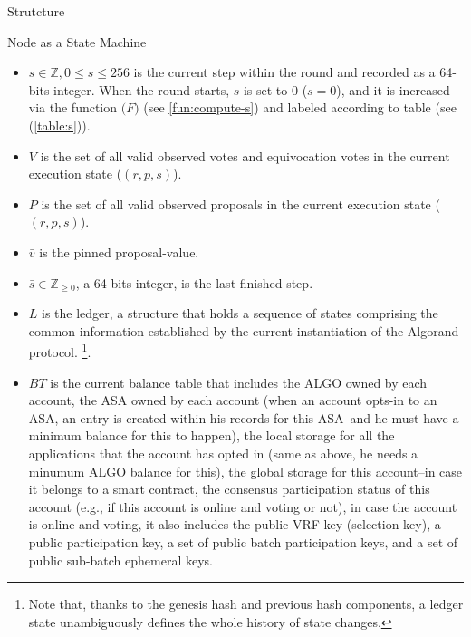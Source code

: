 \documentclass[10pt,a4paper]{article}
\begin{document}
\begin{section}{Strutcture}
\begin{subsection}{Node as a State Machine}
\begin{itemize}
    \item 
    $s\in\mathbb{Z}, 0\le s\le 256$ is the current {\sf step} within the round
    and recorded as a 64-bits integer. When the round starts, $s$ is set to 0 ($s=0$), 
    and it is increased via the function $\mathcal(F)$ (see \ref{fun:compute-s}) and 
    labeled according to table (see (\ref{table:s})).
    
    \item
    $V$ is the set of all {\sf valid observed votes} and 
    {\sf equivocation votes} in the current execution state
    ($(r,p,s)$).
    
    \item
    $P$ is the set of all {\sf valid observed proposals}
    in the current execution state ($(r,p,s)$).
    
    \item
    $\bar{v}$ is the pinned proposal-value.
    
    \item
    $\bar{s}\in\mathbb{Z}_{\ge 0}$, a 64-bits integer, is the {\sf last finished step}.
    
    \item
    $L$ is the {\sf ledger}, a structure that holds a sequence of states comprising the common
    information established by the current instantiation of the Algorand protocol.
    \footnote{Note that, thanks to the genesis hash and previous 
    hash components, a ledger state unambiguously defines the whole history of state changes.}. 
    
    \item
    $BT$ is the current balance table that includes 
      the ALGO owned by each account, 
      the ASA owned by each account (when an account opts-in to an ASA, an entry is created within his records for
        this ASA--and he must have a minimum balance for this to happen),
      the local storage for all the applications that the account has opted in (same as above, he needs a minumum
        ALGO balance for this),
      the global storage for this account--in case it belongs to a smart contract,
      the consensus participation status of this account (e.g., if this account is online and voting or not),
      in case the account is online and voting, it also includes 
        the public VRF key (selection key),
        a public participation key, 
        a set of public batch participation keys, 
        and a set of public sub-batch ephemeral keys.


\end{itemize}
\end{subsection}
\end{section}
\end{document}
